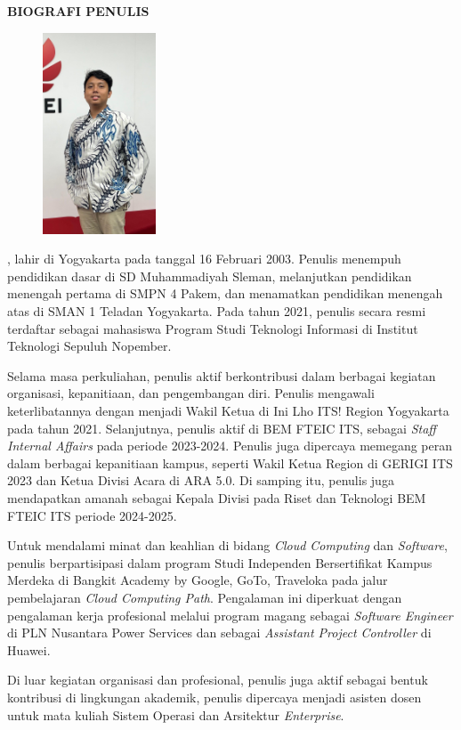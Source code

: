 \begin{center}
  \Large
  \textbf{BIOGRAFI PENULIS}
\end{center}


\vspace{2ex}

\begin{figure}
  \centering
  \vspace{-3ex}
  \includegraphics[width=0.3\textwidth]{gambar/Dzakirozaan Uzlahwasata.jpg}
  \vspace{-4ex}
\end{figure}

\name{}, lahir di Yogyakarta pada tanggal 16 Februari 2003. Penulis menempuh pendidikan dasar di SD Muhammadiyah Sleman, melanjutkan pendidikan menengah pertama di SMPN 4 Pakem, dan menamatkan pendidikan menengah atas di SMAN 1 Teladan Yogyakarta. Pada tahun 2021, penulis secara resmi terdaftar sebagai mahasiswa Program Studi Teknologi Informasi di Institut Teknologi Sepuluh Nopember.

Selama masa perkuliahan, penulis aktif berkontribusi dalam berbagai kegiatan organisasi, kepanitiaan, dan pengembangan diri. Penulis mengawali keterlibatannya dengan menjadi Wakil Ketua di Ini Lho ITS! Region Yogyakarta pada tahun 2021. Selanjutnya, penulis aktif di BEM FTEIC ITS, sebagai \textit{Staff Internal Affairs} pada periode 2023-2024. Penulis juga dipercaya memegang peran dalam berbagai kepanitiaan kampus, seperti Wakil Ketua Region di GERIGI ITS 2023 dan Ketua Divisi Acara di ARA 5.0. Di samping itu, penulis juga mendapatkan amanah sebagai Kepala Divisi pada Riset dan Teknologi BEM FTEIC ITS periode 2024-2025.

Untuk mendalami minat dan keahlian di bidang \textit{Cloud Computing} dan \textit{Software}, penulis berpartisipasi dalam program Studi Independen Bersertifikat Kampus Merdeka di Bangkit Academy by Google, GoTo, Traveloka pada jalur pembelajaran \textit{Cloud Computing Path}. Pengalaman ini diperkuat dengan pengalaman kerja profesional melalui program magang sebagai \textit{Software Engineer} di PLN Nusantara Power Services dan sebagai \textit{Assistant Project Controller} di Huawei.

Di luar kegiatan organisasi dan profesional, penulis juga aktif sebagai bentuk kontribusi di lingkungan akademik, penulis dipercaya menjadi asisten dosen untuk mata kuliah Sistem Operasi dan Arsitektur \textit{Enterprise}.